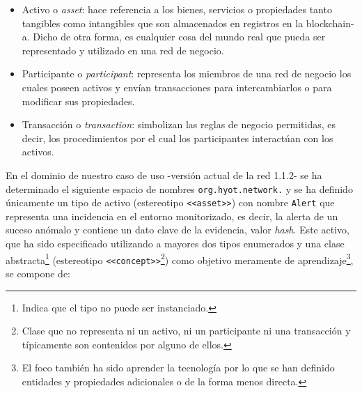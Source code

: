 \documentclass[12pt,a4paper, twoside]{report}
\begin{document}
	\begin{itemize}
		\item Activo o \textit{\gls{asset}}: hace referencia a los bienes, servicios o propiedades tanto tangibles como intangibles que son almacenados en registros en la \gls{blockchain-a}. Dicho de otra forma, es cualquier cosa del mundo real que pueda ser representado y utilizado en una red de negocio.
		\item Participante o \textit{\gls{participant}}: representa los miembros de una red de negocio los cuales poseen activos y envían transacciones para intercambiarlos o para modificar sus propiedades.
		\item Transacción o \textit{\gls{transaction}}: simbolizan las reglas de negocio permitidas, es decir, los procedimientos por el cual los participantes interactúan con los activos.
	\end{itemize}
	
	En el dominio de nuestro caso de uso -versión actual de la red 1.1.2- se ha determinado el siguiente espacio de nombres \texttt{org.hyot.network.} y se ha definido únicamente un tipo de activo (estereotipo \texttt{<<asset>>}) con nombre \texttt{Alert} que representa una incidencia en el entorno monitorizado, es decir, la alerta de un suceso anómalo y contiene un dato clave de la evidencia, valor \textit{hash}. Este activo, que ha sido especificado utilizando a mayores dos tipos enumerados y una clase abstracta\footnote{Indica que el tipo no puede ser instanciado.} (estereotipo \texttt{<<concept>>}\footnote{Clase que no representa ni un activo, ni un participante ni una transacción y típicamente son contenidos por alguno de ellos.}) como objetivo meramente de aprendizaje\footnote{El foco también ha sido aprender la tecnología por lo que se han definido entidades y propiedades adicionales o de la forma menos directa.}, se compone de:
	
\end{document}
